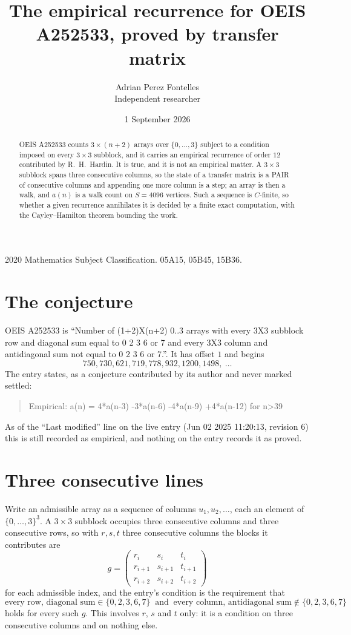 \documentclass[11pt,a4paper]{article}
\title{The empirical recurrence for OEIS A252533, proved by transfer matrix}
\author{Adrian Perez Fontelles\\ \small Independent researcher}
\date{1 September 2026}
\theoremstyle{plain}
\theoremstyle{definition}
\begin{document}
\maketitle

\begin{abstract}
OEIS A252533 counts $3\times(n+2)$ arrays over $\{0,\dots,3\}$ subject to a condition imposed on
every $3\times3$ subblock, and it carries an empirical recurrence of order $12$
contributed by R.~H.~Hardin. It is true, and it is not an empirical matter. A $3\times3$
subblock spans three consecutive columns, so the state of a transfer matrix is a PAIR of
consecutive columns and appending one more column is a step; an array is then a walk, and
$a(n)$ is a walk count on $S=4096$ vertices. Such a sequence is $C$-finite, so whether a given
recurrence annihilates it is decided by a finite exact computation, with the Cayley--Hamilton
theorem bounding the work.
\end{abstract}

\noindent\small 2020 Mathematics Subject Classification. 05A15, 05B45, 15B36.\normalsize

\section{The conjecture}

OEIS A252533 is ``Number of (1+2)X(n+2) 0..3 arrays with every 3X3 subblock row and diagonal sum equal to 0 2 3 6 or 7 and every 3X3 column and antidiagonal sum not equal to 0 2 3 6 or 7.''. It has offset $1$ and begins
\[
750, 730, 621, 719, 778, 932, 1200, 1498,\ \dots
\]
The entry states, as a conjecture contributed by its author and never marked settled:
\begin{quote}
Empirical: a(n) = 4*a(n-3) -3*a(n-6) -4*a(n-9) +4*a(n-12) for n>39
\end{quote}
As of the ``Last modified'' line on the live entry (Jun 02 2025 11:20:13, revision 6) this is still
recorded as empirical, and nothing on the entry records it as proved.

\section{Three consecutive lines}

Write an admissible array as a sequence of columns $u_1,u_2,\dots$, each an element of
$\{0,\dots,3\}^{3}$. A $3\times3$ subblock occupies three consecutive columns and
three consecutive rows, so with $r,s,t$ three consecutive columns the blocks it
contributes are
\[
g=\begin{pmatrix}r_i&s_i&t_i\\ r_{i+1}&s_{i+1}&t_{i+1}\\ r_{i+2}&s_{i+2}&t_{i+2}\end{pmatrix}
\]
for each admissible index, and the entry's condition is the requirement that
\[
\text{every row, diagonal sum} \in \{0,2,3,6,7\}\ \text{ and }\ \text{every column, antidiagonal sum} \notin \{0,2,3,6,7\}
\]
holds for every such $g$. This involves $r$, $s$ and $t$ only: it is a condition on
three consecutive columns and on nothing else.
\end{document}
